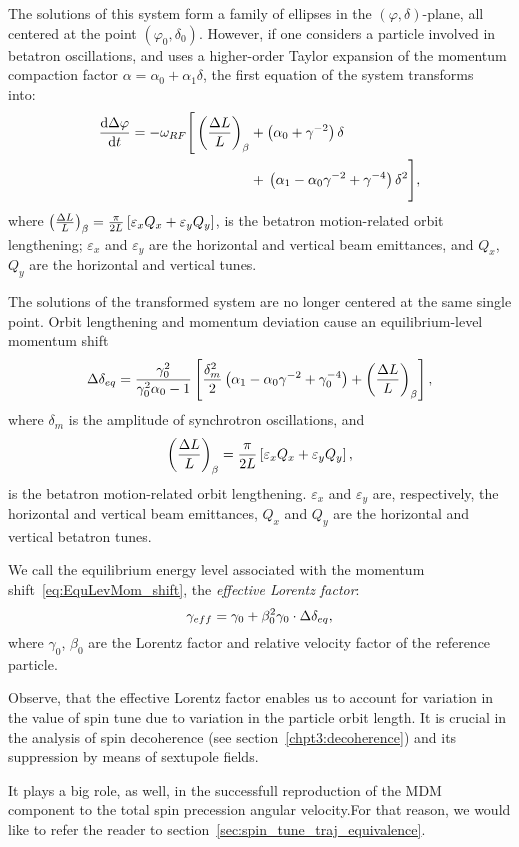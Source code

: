 The solutions of this system form a family of ellipses in the $(\varphi, \delta)$-plane, all centered at the
point $(\varphi_0,\delta_0)$. However, if one considers a particle involved in betatron oscillations, and
uses a higher-order Taylor expansion of the momentum compaction factor
$\alpha = \alpha_0 + \alpha_1\delta$, the first equation of the system
transforms into:~\cite[p.~2579]{Senichev:IPAC13}
\begin{align*}
  \ddt{\D\varphi} = -\w_{RF} \Bigg[\bkt{\frac{\Delta L}{L}}_\beta &+ \bkt{\alpha_0 + \gamma^{-2}}\delta \Bigg.\\
    &+ \Bigg.\bkt{\alpha_1 - \alpha_0\gamma^{-2} + \gamma^{-4}}\delta^2\Bigg],
\end{align*}
where $\bkt{\frac{\Delta L}{L}}_\beta = \frac{\pi}{2L}\bkt*{\varepsilon_xQ_x + \varepsilon_yQ_y}$, is
the betatron motion-related orbit lengthening; $\varepsilon_x$ and $\varepsilon_y$ are
the horizontal and vertical beam emittances, and $Q_x$, $Q_y$ are the horizontal and vertical tunes.

The solutions of the transformed system are no longer centered at the same single point. Orbit lengthening
and momentum deviation cause an equilibrium-level momentum shift~\cite[p.~2581]{Senichev:IPAC13}
\begin{equation}\label{eq:EquLevMom_shift}
\Delta\delta_{eq} = \frac{\gamma_0^2}{\gamma_0^2\alpha_0 - 1}\bkt*{\frac{\delta_m^2}{2}\bkt{\alpha_1 - \alpha_0\gamma^{-2} + \gamma_0^{-4}} + \bkt{\frac{\Delta L}{L}}_\beta},
\end{equation}
where $\delta_m$ is the amplitude of synchrotron oscillations, and
\begin{equation}\label{eq:betatron_OL}
	\bkt{\frac{\D L}{L}}_\beta = \frac{\pi}{2L}\bkt*{\varepsilon_xQ_x + \varepsilon_yQ_y},
\end{equation}
is the betatron motion-related orbit lengthening. $\varepsilon_x$ and $\varepsilon_y$ are, respectively, 
the horizontal and vertical beam emittances, $Q_x$ and $Q_y$ are the horizontal and vertical betatron tunes.

We call the equilibrium energy level associated with the momentum shift~\eqref{eq:EquLevMom_shift},
the \emph{effective Lorentz factor}:
\begin{equation}\label{eq:EffectiveGamma}
\g*= \gamma_0 + \beta_0^2\gamma_0\cdot\Delta\delta_{eq},
\end{equation}
where $\gamma_0$, $\beta_0$ are the Lorentz factor and relative velocity factor of the reference particle.

Observe, that the effective Lorentz factor enables us to account for variation in the value of spin tune
due to variation in the particle orbit length. It is crucial in the analysis of
spin decoherence (see section~\ref{chpt3:decoherence}) and its suppression by means of sextupole fields.


It plays a big role, as well, in the successfull reproduction of the MDM component to the total spin precession
angular velocity.For that reason, we would like to refer the reader to section~\ref{sec:spin_tune_traj_equivalence}.

